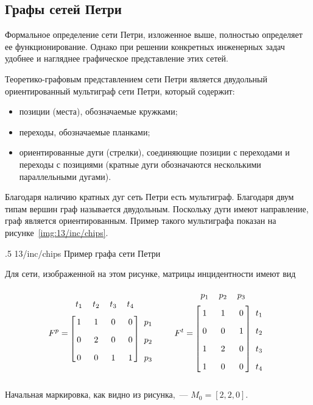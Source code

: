 \subsection{Графы сетей Петри}

Формальное определение сети Петри, изложенное выше, полностью определяет ее функционирование. Однако при решении конкретных инженерных задач удобнее и нагляднее графическое представление этих сетей. 

Теоретико-графовым представлением сети Петри является двудольный ориентированный мультиграф сети Петри, который содержит:

\begin{itemize}
    \item позиции (места), обозначаемые кружками;
    \item переходы, обозначаемые планками;
    \item ориентированные дуги (стрелки), соединяющие позиции с переходами и переходы с позициями (кратные дуги обозначаются несколькими параллельными дугами).
\end{itemize}

Благодаря наличию кратных дуг сеть Петри есть мультиграф. Благодаря двум типам вершин граф называется двудольным. Поскольку дуги имеют направление, граф является ориентированным. Пример такого мультиграфа показан на рисунке~\ref{img:13/inc/chips}.

\image
{.5\textwidth}
{13/inc/chips}
{Пример графа сети Петри}

Для сети, изображенной на этом рисунке, матрицы инцидентности имеют вид
%
\begin{equation*}
    \renewcommand*{\arraystretch}{1.75}
    F^p = \begin{blockarray}{ccccc}
        t_1 & t_2 & t_3 & t_4 & \\
        \begin{block}{[cccc]c}
          1 & 1 & 0 & 0 & p_1\\
          0 & 2 & 0 & 0 & p_2\\
          0 & 0 & 1 & 1 & p_3\\
        \end{block}
        \end{blockarray}
        \quad\quad
    F^t = \begin{blockarray}{cccc}
        p_1 & p_2 & p_3 & \\
        \begin{block}{[ccc]c}
            1 & 1 & 0 & t_1\\
            0 & 0 & 1 & t_2\\
            1 & 2 & 0 & t_3\\
            1 & 0 & 0 & t_4\\
        \end{block}
        \end{blockarray}
\end{equation*}
%
Начальная маркировка, как видно из рисунка,~--- ${M_0 = [2, 2, 0]}$.

